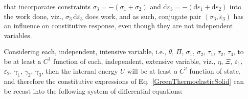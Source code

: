 that incorporates constraints $\sigma_3 = -(\sigma_1 + \sigma_2)$ and $\mathrm{d} \varepsilon_3 = -( \mathrm{d} \varepsilon_1 + \mathrm{d} \varepsilon_2 )$ into the work done, viz., $\sigma_3 \, \mathrm{d} \varepsilon_3$ does work, and as such, conjugate pair $( \sigma_3 , \varepsilon_3 )$ has an influence on constitutive response, even though they are not independent variables.

Considering each, independent, intensive variable, i.e., $\theta$, $\Pi$, $\sigma_1$, $\sigma_2$, $\tau_1$, $\tau_2$, $\tau_3$, to be at least a $C^1$ function of each, independent, extensive variable, viz., $\eta$, $\Xi$, $\varepsilon_1$, $\varepsilon_2$, $\gamma_1$, $\gamma_2$, $\gamma_3$, then the internal energy $U$ will be at least a $C^2$ function of state, and therefore the constitutive expressions of Eq.~\ref{GreenThermoelasticSolid} can be recast into the following system of differential equations:
\footnotesize
